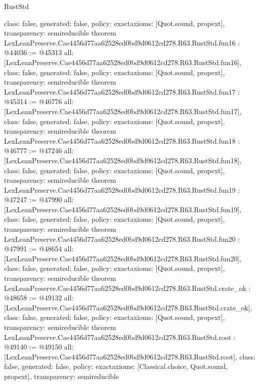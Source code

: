\begin{lexlean}{RustStd}
\begin{coremodule}
{  class: false,
  generated: false,
  policy: exact{axioms: [Quot.sound, propext]},
  transparency: semireducible
}
theorem LexLeanPreserve.Cae4456d77aa62528ed0bd9d0612cd278.R63.RustStd.fun16 : @44036 := @45313 {
  all: [LexLeanPreserve.Cae4456d77aa62528ed0bd9d0612cd278.R63.RustStd.fun16],
  class: false,
  generated: false,
  policy: exact{axioms: [Quot.sound, propext]},
  transparency: semireducible
}
theorem LexLeanPreserve.Cae4456d77aa62528ed0bd9d0612cd278.R63.RustStd.fun17 : @45314 := @46776 {
  all: [LexLeanPreserve.Cae4456d77aa62528ed0bd9d0612cd278.R63.RustStd.fun17],
  class: false,
  generated: false,
  policy: exact{axioms: [Quot.sound, propext]},
  transparency: semireducible
}
theorem LexLeanPreserve.Cae4456d77aa62528ed0bd9d0612cd278.R63.RustStd.fun18 : @46777 := @47246 {
  all: [LexLeanPreserve.Cae4456d77aa62528ed0bd9d0612cd278.R63.RustStd.fun18],
  class: false,
  generated: false,
  policy: exact{axioms: [Quot.sound, propext]},
  transparency: semireducible
}
theorem LexLeanPreserve.Cae4456d77aa62528ed0bd9d0612cd278.R63.RustStd.fun19 : @47247 := @47990 {
  all: [LexLeanPreserve.Cae4456d77aa62528ed0bd9d0612cd278.R63.RustStd.fun19],
  class: false,
  generated: false,
  policy: exact{axioms: [Quot.sound, propext]},
  transparency: semireducible
}
theorem LexLeanPreserve.Cae4456d77aa62528ed0bd9d0612cd278.R63.RustStd.fun20 : @47991 := @48654 {
  all: [LexLeanPreserve.Cae4456d77aa62528ed0bd9d0612cd278.R63.RustStd.fun20],
  class: false,
  generated: false,
  policy: exact{axioms: [Quot.sound, propext]},
  transparency: semireducible
}
theorem LexLeanPreserve.Cae4456d77aa62528ed0bd9d0612cd278.R63.RustStd.crate_ok : @48658 := @49132 {
  all: [LexLeanPreserve.Cae4456d77aa62528ed0bd9d0612cd278.R63.RustStd.crate_ok],
  class: false,
  generated: false,
  policy: exact{axioms: [Quot.sound, propext]},
  transparency: semireducible
}
theorem LexLeanPreserve.Cae4456d77aa62528ed0bd9d0612cd278.R63.RustStd.root : @49140 := @49150 {
  all: [LexLeanPreserve.Cae4456d77aa62528ed0bd9d0612cd278.R63.RustStd.root],
  class: false,
  generated: false,
  policy: exact{axioms: [Classical.choice, Quot.sound, propext]},
  transparency: semireducible
}


\end{coremodule}
\end{lexlean}
